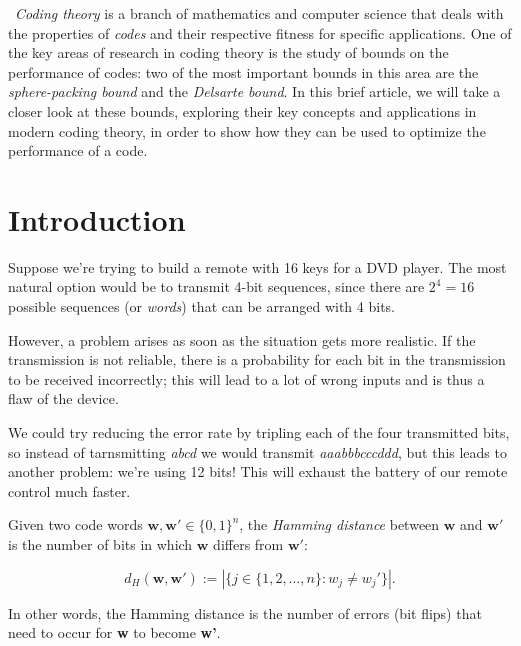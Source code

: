 \maketitle

\
{\em Coding theory} is a branch of mathematics and computer science that deals with the properties of {\em codes} and their respective fitness for specific applications. One of the key areas of research in coding theory is the study of bounds on the performance of codes: two of the most important bounds in this area are the {\em sphere-packing bound} and the {\em Delsarte bound}. In this brief article, we will take a closer look at these bounds, exploring their key concepts and applications in modern coding theory, in order to show how they can be used to optimize the performance of a code.


\section{Introduction}
Suppose we're trying to build a remote with 16 keys for a DVD player. The most natural option would be to transmit 4-bit sequences, since there are $2^4=16$ possible sequences (or {\em words}) that can be arranged with 4 bits.

However, a problem arises as soon as the situation gets more realistic. If the transmission is not reliable, there is a probability for each bit in the transmission to be received incorrectly; this will lead to a lot of wrong inputs and is thus a flaw of the device.

We could try reducing the error rate by tripling each of the four transmitted bits, so instead of tarnsmitting {\em abcd} we would transmit {\em aaabbbcccddd}, but this leads to another problem: we're using 12 bits! This will exhaust the battery of our remote control much faster.

\begin{definition}
Given two code words $\textbf{w}, \textbf{w}' \in \{0,1\}^n$, the \emph{Hamming distance} between $\textbf{w}$ and $\textbf{w}'$ is the number of bits in which $\textbf{w}$ differs from $\textbf{w}'$:

\begin{equation}
    d_H(\textbf{w}, \textbf{w}') := |\{j \in \{1, 2, \ldots, n\} : w_j \neq w_j'\}|.
\end{equation}
\end{definition}
In other words, the Hamming distance is the number of errors (bit flips) that need to occur for \textbf{w} to become \textbf{w'}.

